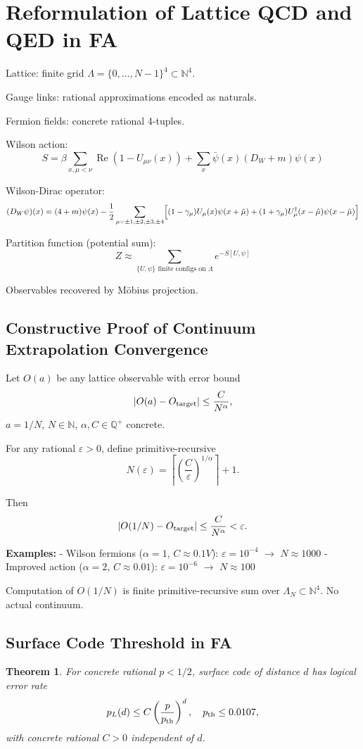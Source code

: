 \documentclass[11pt]{article}
\theoremstyle{plain}
\newtheorem{theorem}{Theorem}[section]
\begin{document}
\section{Reformulation of Lattice QCD and QED in FA}
Lattice: finite grid $\Lambda = \{0,\dots,N-1\}^4 \subset \mathbb{N}^4$.

Gauge links: rational approximations encoded as naturals.

Fermion fields: concrete rational 4-tuples.

Wilson action:
\[
S = \beta \sum_{x,\mu<\nu} \operatorname{Re}(1 - U_{\mu\nu}(x)) + \sum_x \bar\psi(x) (D_W + m) \psi(x)
\]

Wilson-Dirac operator:
\[
(D_W \psi)(x) = (4 + m)\psi(x) - \frac12 \sum_{\mu=\pm1,\pm2,\pm3,\pm4} \Bigl[(1 - \gamma_\mu) U_\mu(x) \psi(x+\hat\mu) + (1 + \gamma_\mu) U_\mu^\dagger(x-\hat\mu) \psi(x-\hat\mu)\Bigr]
\]

Partition function (potential sum):
\[
Z \approx \sum_{\{U,\psi\}\text{ finite configs on } \Lambda} e^{-S[U,\psi]}
\]

Observables recovered by Möbius projection.

\subsection{Constructive Proof of Continuum Extrapolation Convergence}
Let $O(a)$ be any lattice observable with error bound
\[
|O(a) - O_{\rm target}| \le \frac{C}{N^\alpha},
\]
$a=1/N$, $N\in\mathbb{N}$, $\alpha,C\in\mathbb{Q}^+$ concrete.

For any rational $\varepsilon>0$, define primitive-recursive
\[
N(\varepsilon) = \left\lceil \left( \frac{C}{\varepsilon} \right)^{1/\alpha} \right\rceil + 1.
\]

Then
\[
|O(1/N) - O_{\rm target}| \le \frac{C}{N^\alpha} < \varepsilon.
\]

\textbf{Examples:}
- Wilson fermions ($\alpha=1$, $C\approx0.1V$): $\varepsilon=10^{-4}$ $\to$ $N\approx1000$
- Improved action ($\alpha=2$, $C\approx0.01$): $\varepsilon=10^{-6}$ $\to$ $N\approx100$

Computation of $O(1/N)$ is finite primitive-recursive sum over $\Lambda_N\subset\mathbb{N}^4$. No actual continuum.

\subsection{Surface Code Threshold in FA}
\begin{theorem}
For concrete rational $p < 1/2$, surface code of distance $d$ has logical error rate
\[
p_L(d) \le C \left( \frac{p}{p_{\rm th}} \right)^d, \quad p_{\rm th} \le 0.0107,
\]
with concrete rational $C > 0$ independent of $d$.
\end{theorem}
\end{document}
